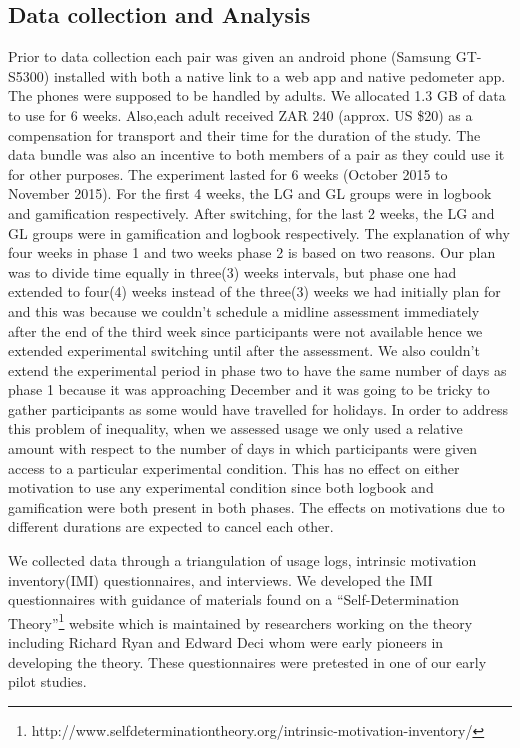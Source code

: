 \documentclass{sig-alternate}
\begin{document}
\subsection{Data collection and Analysis} 
Prior to data collection each pair was given an android phone (Samsung
GT-S5300) installed with both a native link to a web app and native pedometer app. The phones were supposed to be handled by adults. We allocated 1.3 GB of data to use for 6 weeks. Also,each adult received ZAR 240 (approx. US \$20) as a compensation for transport and their time for the duration of the study. The data bundle was also an incentive to both members of a pair as they could use it for other purposes. \newline
The experiment lasted for 6 weeks (October 2015 to November 2015). For the first 4 weeks, the LG and GL groups were in logbook and gamification respectively. After switching, for the last 2 weeks, the LG and GL groups were in gamification and logbook respectively. The explanation of why four weeks in phase 1 and two weeks phase 2 is based on two reasons. Our plan was to divide time equally in three(3) weeks intervals, but phase one had extended to four(4) weeks instead of the three(3) weeks we had initially plan for and this was because we couldn't schedule a midline assessment immediately after the end of the third week since participants were not available hence we extended experimental switching until after the assessment. We also couldn't extend the experimental period in phase two to have the same number of days as phase 1 because it was approaching December and it was going to be tricky to gather participants as some would have travelled for holidays. In order to address this problem of inequality, when we assessed usage we only used a relative amount with respect to the number of days in which participants were given access to a particular experimental condition. This has no effect on either motivation to use any experimental condition since both logbook and gamification were both present in both phases. The effects on motivations due to different durations are expected to cancel each other.

We collected data through a triangulation of usage logs, intrinsic motivation inventory(IMI) questionnaires, and interviews. We developed the IMI questionnaires with guidance of materials found on a ``Self-Determination Theory''\footnote{http://www.selfdeterminationtheory.org/intrinsic-motivation-inventory/} website which is maintained by researchers working on the theory including Richard Ryan and Edward Deci\cite{deci1985intrinsic} whom were early pioneers in developing the theory. These questionnaires were pretested in one of our early pilot studies.
\end{document}
